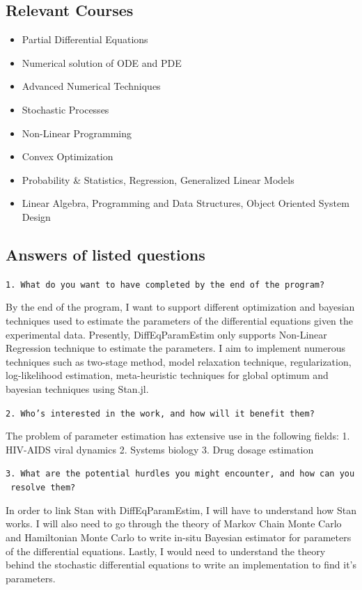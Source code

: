 \documentclass[11pt]{article}
\providecommand{\tightlist}{%
      \setlength{\itemsep}{0pt}\setlength{\parskip}{0pt}}
\begin{document}
\subsection{Relevant Courses}\label{relevant-courses}

\begin{itemize}
\tightlist
\item
  Partial Differential Equations
\item
  Numerical solution of ODE and PDE
\item
  Advanced Numerical Techniques
\item
  Stochastic Processes
\item
  Non-Linear Programming
\item
  Convex Optimization
\item
  Probability \& Statistics, Regression, Generalized Linear Models
\item
  Linear Algebra, Programming and Data Structures, Object Oriented
  System Design
\end{itemize}

\subsection{Answers of listed
questions}\label{answers-of-listed-questions}

\texttt{1.\ What\ do\ you\ want\ to\ have\ completed\ by\ the\ end\ of\ the\ program?}

By the end of the program, I want to support different optimization and
bayesian techniques used to estimate the parameters of the differential
equations given the experimental data. Presently, DiffEqParamEstim only
supports Non-Linear Regression technique to estimate the parameters. I
aim to implement numerous techniques such as two-stage method, model
relaxation technique, regularization, log-likelihood estimation,
meta-heuristic techniques for global optimum and bayesian techniques
using Stan.jl.

\texttt{2.\ Who’s\ interested\ in\ the\ work,\ and\ how\ will\ it\ benefit\ them?}

The problem of parameter estimation has extensive use in the following
fields: 1. HIV-AIDS viral dynamics 2. Systems biology 3. Drug dosage
estimation

\texttt{3.\ What\ are\ the\ potential\ hurdles\ you\ might\ encounter,\ and\ how\ can\ you\ resolve\ them?}

In order to link Stan with DiffEqParamEstim, I will have to understand
how Stan works. I will also need to go through the theory of Markov
Chain Monte Carlo and Hamiltonian Monte Carlo to write in-situ Bayesian
estimator for parameters of the differential equations. Lastly, I would
need to understand the theory behind the stochastic differential
equations to write an implementation to find it's parameters.
\end{document}
